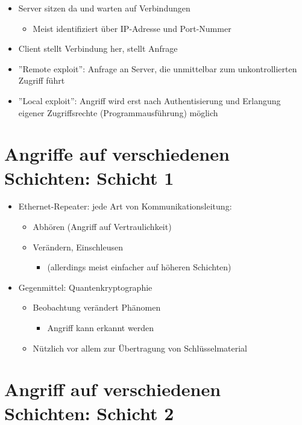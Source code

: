 \documentclass[openany]{book}
\begin{document}
\begin{itemize}
    \item Server sitzen da und warten auf Verbindungen
    \begin{itemize}
        \item Meist identifiziert über IP-Adresse und Port-Nummer
    \end{itemize}
    \item Client stellt Verbindung her, stellt Anfrage
    \item ''Remote exploit'': Anfrage an Server, die unmittelbar zum unkontrollierten Zugriff führt
    \item ''Local exploit'': Angriff wird erst nach Authentisierung und Erlangung eigener Zugriffsrechte (Programmausführung) möglich
\end{itemize}

\section{Angriffe auf verschiedenen Schichten: Schicht 1}

\begin{itemize}
    \item Ethernet-Repeater: jede Art von Kommunikationsleitung:
    \begin{itemize}
        \item Abhören (Angriff auf Vertraulichkeit)
        \item Verändern, Einschleusen
        \begin{itemize}
            \item (allerdings meist einfacher auf höheren Schichten)
        \end{itemize}
    \end{itemize}
    \item Gegenmittel: Quantenkryptographie
    \begin{itemize}
        \item Beobachtung verändert Phänomen
        \begin{itemize}
            \item Angriff kann erkannt werden
        \end{itemize}
        \item Nützlich vor allem zur Übertragung von Schlüsselmaterial
    \end{itemize}
\end{itemize}

\section{Angriff auf verschiedenen Schichten: Schicht 2}
\end{document}
